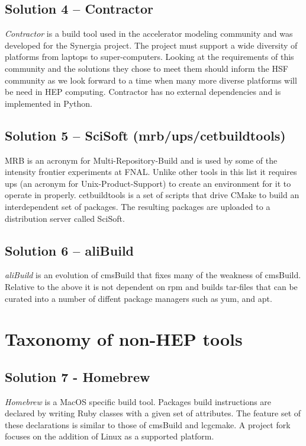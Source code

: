 \documentclass[12pt,a4paper]{article}
\begin{document}
\subsection{Solution 4 -- Contractor}
\emph{Contractor}\cite{contractor} is a build tool used in the accelerator modeling community and was developed for the Synergia project.  The project must support a wide diversity of platforms from laptops to super-computers.  Looking at the requirements of this community and the solutions they chose to meet them should inform the HSF community as we look forward to a time when many more diverse platforms will be need in HEP computing.  Contractor has no external dependencies and is implemented in Python.

\subsection{Solution 5 -- SciSoft (mrb/ups/cetbuildtools)}
MRB is an acronym for Multi-Repository-Build and is used by some of the intensity frontier experiments at FNAL. Unlike other tools in this list it requires ups (an acronym for Unix-Product-Support) to create an environment for it to operate in properly.  cetbuildtools is a set of scripts that drive CMake to build an interdependent set of packages.  The resulting packages are uploaded to a distribution server called SciSoft.

\subsection{Solution 6 -- aliBuild}
\emph{aliBuild}\cite{aliBuild} is an evolution of cmsBuild that fixes many of the weakness of cmsBuild. Relative to the above it is not dependent on rpm and builds tar-files that can be curated into a number of diffent package managers such as yum, and apt.

\section{Taxonomy of non-HEP tools}
\subsection{Solution 7 - Homebrew }
\emph{Homebrew}\cite{homebrew} is a MacOS specific build tool. Packages build instructions are declared by writing Ruby classes with a given set of attributes. The feature set of these declarations is similar to those of cmsBuild and lcgcmake. A project fork focuses on the addition of Linux as a supported platform.
\end{document}
